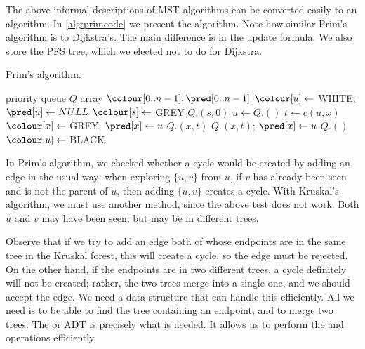 The above informal descriptions of MST algorithms can be converted easily
to an algorithm. In \cref{alg:primcode} we present the algorithm. Note
how similar Prim's algorithm is to Dijkstra's. The main difference is
in the update formula. We also store the PFS tree, which we elected not
to do for Dijkstra.

\begin{algorithm}[H]
  \caption{Prim's algorithm.}
  \label{alg:primcode}
\begin{algorithmic}[1]
	\State priority queue $Q$
	\State array $\colour[0..n-1], \pred[0..n-1]$
		\Stae $\colour[u] \gets$ WHITE; $\pred[u] \gets NULL$ 
	\EndFor
	\State $\colour[s] \gets $ GREY
	\State $Q$.$(s, 0)$
		\State $u \gets Q$.$()$
			\State $t \gets c(u, x)$
				\State $\colour[x] \gets $ GREY; $\pred[x] \gets u$
				\State $Q$.$(x, t)$
				\State $Q$.$(x, t)$; $\pred[x] \gets u$
			\EndIf
		\EndFor
		\State $Q$.$()$
		\State $\colour[u] \gets $ BLACK
	\EndWhile
	\State \Return{$\pred$}
\EndFunction
\end{algorithmic}
\end{algorithm}


In Prim's algorithm, we checked whether a cycle would be created by adding
an edge in the usual way: when exploring $\{u, v\}$ from $u$, if $v$ has
already been seen and is not the parent of $u$, then adding $\{u, v\}$
creates a cycle. With Kruskal's algorithm, we must use another method,
since the above test does not work. Both $u$ and $v$ may have been seen,
but may be in different trees.

Observe that if we try to add an edge both of whose endpoints are in
the same tree in the Kruskal forest, this will create a cycle, so the
edge must be rejected. On the other hand, if the endpoints are in two
different trees, a cycle definitely will not be created; rather, the two
trees merge into a single one, and we should accept the edge. We need
a data structure that can handle this efficiently. All we need is to be
able to find the tree containing an endpoint, and to merge two trees. The
 or  ADT is precisely what
is needed. It allows us to perform the  and 
operations efficiently. %


